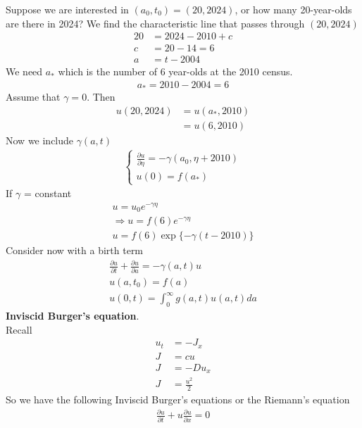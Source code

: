 \documentclass[12pt, letterpaper]{article}
\begin{document}
Suppose we are interested in $(a_0, t_0) = (20,2024)$, or how many 20-year-olds are there in 2024?
We find the characteristic line that passes through $(20,2024)$
\begin{align*}
    20 &= 2024 - 2010 + c \\
    c &= 20 - 14 = 6 \\
    a &= t - 2004
\end{align*}
We need $a_\ast$ which is the number of 6 year-olds at the 2010 census. 
\begin{align*}
    a_\ast = 2010 - 2004 = 6
\end{align*}
Assume that $\gamma = 0$. Then 
\begin{align*}
    u(20,2024) &= u(a_\ast, 2010) \\
    &= u(6,2010)
\end{align*}
Now we include $\gamma(a, t)$
\begin{align*}
    \begin{cases}
        \frac{\partial u}{\partial \eta} = - \gamma(a_0, \eta+2010) \\
        u(0) = f(a_\ast)
    \end{cases}
\end{align*}
If $\gamma$ = constant 
\begin{align*}
    u = u_0 e^{-\gamma \eta} \\
    \Rightarrow u = f(6) e^{-\gamma \eta} \\
    u = f(6) \exp\{-\gamma (t-2010)\}
\end{align*}
 Consider now with a birth term
\begin{align*}
    \frac{\partial u}{\partial t} + \frac{\partial u}{\partial a} = -\gamma(a,t)u \\
    u(a,t_0) = f(a) \\
    u(0,t) = \int_{0}^{\infty} g(a,t)u(a,t)da
\end{align*}
\textbf{Inviscid Burger's equation}. \\
Recall 
\begin{align*}
    u_t &= - J_x \\
    J &= cu \tag{transport}\\
    J &= -Du_x \tag{diffusion} \\
    J &= \frac{u^2}{2} 
\end{align*}
So we have the following Inviscid Burger's equations or the Riemann's equation
\begin{align*}
    \frac{\partial u}{\partial t} + u \frac{\partial u}{\partial x} = 0 
\end{align*}
\end{document}
